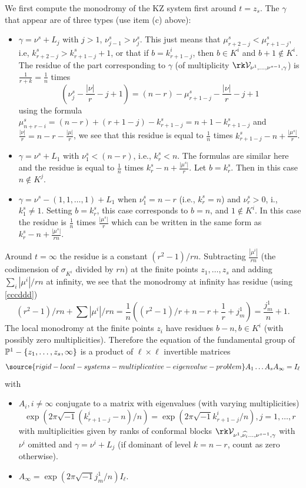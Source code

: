 We first compute the monodromy of the KZ system first around $t=z_s$. The $\gamma$ that appear are of three types (use item (c) above):
\begin{itemize}
\item[-] $\gamma=\nu^s+L_j$ with  $j>1$, $\nu^s_{j-1}> \nu^s_j$. This just means that $\mu^s_{r+2-j}<\mu^s_{r+1-j}$,
i.e, $k^s_{r+2-j}> k^s_{r+1-j} +1$, or that if $b=k^i_{r+1-j}$, then $b\in K^i$ and $b+1\not\in K^i$. The residue of the part corresponding to $\gamma$ (of multiplicity  $\rk \mathcal{V}_{\nu^1,\dots,\nu^{s-1},\gamma}$) is $\frac{1}{r+k}=\frac{1}{n}$ times
$$(\nu^s_j -\frac{|\nu|}{r} -j +1)= (n-r)-\mu^s_{r+1-j}-\frac{|\nu|}{r} -j +1$$
using the formula $\mu^s_{n+r-i}=(n-r)+(r+1-j)-k^s_{r+1-j}=n+1-k^s_{r+1-j}$ and $\frac{|\nu|}{r}=n-r-\frac{|\mu|}{r}$, we see that this residue is equal to $\frac{1}{n}$ times $k^s_{r+1-j}-n +\frac{|\mu^s|}{r}$.
\item[-] $\gamma=\nu^s+L_1$ with $\nu^s_{1}< (n-r)$, i.e., $k^s_r<n$.  The formulas are similar here and the residue is equal to  $\frac{1}{n}$ times $k^s_{r}-n +\frac{|\mu^s|}{r}$. Let $b=k^s_r$. Then in this case $n\not\in K^j$.
\item[-] $\gamma=\nu^s -(1,1,\dots,1) +L_1$ when $\nu^s_1=n-r$ (i.e., $k^s_r=n$) and $\nu^s_r>0$, i., $k^s_1\neq 1$. Setting $b=k^s_r$, this case corresponds to $b=n$, and $1\not\in K^i$.
In this case the residue is $\frac{1}{n}$ times $\frac{|\mu^s|}{r}$ which can be written in the same form as $k^s_{r}-n +\frac{|\mu^s|}{rn}$.
\end{itemize}
Around $t=\infty$ the residue is a constant $(r^2-1)/rn$. Subtracting  $\frac{|\mu^i|}{rn}$ (the codimension of $\sigma_{K^i}$ divided by $rn$) at the finite points $z_1,\dots,z_s$ and adding $\sum_i|\mu^i|/rn$ at infinity, we see that the monodromy at infinity has residue (using \eqref{cccddd})
$$(r^2-1)/rn +\sum|\mu^i|/rn = \frac{1}{n}((r^2-1)/r +n-r+ \frac{1}{r} +j^1_m) =\frac{j^1_m}{n}+1.$$
The local monodromy at the finite points $z_i$ have residues $b-n, b\in K^i$ (with possibly zero multiplicities). Therefore the equation of the fundamental group of $\Bbb{P}^1-\{z_1,\dots,z_s,\infty\}$ is a product of $\ell\times \ell$ invertible matrices
\begin{equation}\label{KZMatrix}
\source{rigid-local-systems-multiplicative-eigenvalue-problem}
A_1\dots A_s A_{\infty}=I_{\ell}
\end{equation}
with
\begin{itemize}
\item  $A_i, i\neq \infty$ conjugate to a matrix with eigenvalues (with varying multiplicities)
$$\exp(2\pi\sqrt{-1}(k^i_{r+1-j}-n)/n)= \exp(2\pi\sqrt{-1}k^i_{r+1-j}/n), j=1,\dots,r$$
with multiplicities given by  ranks of conformal blocks $\rk \mathcal{V}_{\nu^1,\widehat{\nu_i}\dots,\nu^{s-1},\gamma}$ with $\nu^i$ omitted and $\gamma=\nu^i+L_j$ (if dominant of level $k=n-r$, count as zero otherwise).
\item $A_{\infty}=\exp(2\pi\sqrt{-1}j^1_m/n)I_{\ell}$.
\end{itemize}
